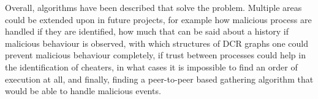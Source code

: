 \newpar Overall, algorithms have been described that solve the problem. Multiple areas could be extended upon in future projects, for example how malicious process are handled if they are identified, how much that can be said about a history if malicious behaviour is observed, with which structures of DCR graphs one could prevent malicious behaviour completely, if trust between processes could help in the identification of cheaters, in what cases it is impossible to find an order of execution at all, and finally, finding a peer-to-peer based gathering algorithm that would be able to handle malicious events.